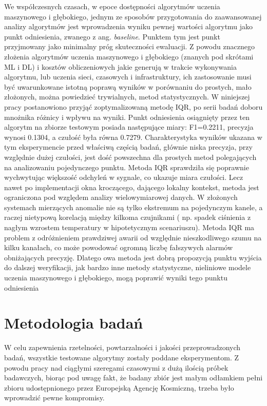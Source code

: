 \documentclass[a4paper,twoside,12pt]{book}
\newcommand{\obcy}[1]{\emph{#1}}
\newcommand{\english}[1]{{\selectlanguage{british}\obcy{#1}}}
\begin{document}
	We współczesnych czasach, w epoce dostępności algorytmów uczenia maszynowego i głębokiego, jednym ze sposobów przygotowania do zaawansowanej analizy algorytmów jest wprowadzenia wyniku pewnej wartości algorytmu jako punkt odniesienia, zwanego z ang. \english{baseline}. Punktem tym jest punkt przyjmowany jako minimalny próg skuteczności ewaluacji. Z powodu znacznego złożenia algorytmów uczenia maszynowego i głębokiego (znanych pod skrótami ML i DL) i kosztów obliczeniowych jakie generują w trakcie wykonywania algorytmu, lub uczenia sieci, czasowych i infrastruktury, ich zastosowanie musi być uwarunkowane istotną poprawą wyników w porównaniu do prostych, mało złożonych, można powiedzieć trywialnych, metod statystycznych. 
	W niniejszej pracy postanowiono przyjąć zoptymalizowaną metodę IQR, po serii badań doboru mnożnika różnicy i wpływu na wyniki. Punkt odniesienia osiągnięty przez ten algorytm na zbiorze testowym posiada następujące miary: F1=0.2211, precyzja wynosi 0.1304, a czułość była równa 0.7279.
	Charakterystyka wyników ukazana w tym eksperymencie przed właściwą częścią badań, głównie niska precyzja, przy względnie dużej czułości, jest dość powszechna dla prostych metod polegających na analizowaniu pojedynczego punktu. Metoda IQR sprawdziła się poprawnie wychwytując większość odchyleń w sygnale, co ukazuje miara czułości. Lecz nawet po implementacji okna kroczącego, dającego lokalny kontekst, metoda jest ograniczona pod względem analizy wielowymiarowej danych. W złożonych systemach mierzących anomalie nie są tylko ekstremum na pojedynczym kanele, a raczej nietypową korelacją między kilkoma czujnikami ( np. spadek ciśnienia z nagłym wzrostem temperatury w hipotetycznym scenariuszu). Metoda IQR ma problem z odróżnieniem prawdziwej awarii od względnie nieszkodliwego szumu na kilku kanałach, co może powodować ogromną liczbę fałszywych alarmów obniżających precyzję. Dlatego owa metoda jest dobrą propozycją punktu wyjścia do dalszej weryfikacji, jak bardzo inne metody statystyczne, nieliniowe modele uczenia maszynowego i głębokiego, mogą poprawić wyniki tego punktu odniesienia 
	
	
	\section{Metodologia badań}
	W celu zapewnienia rzetelności, powtarzalności i jakości przeprowadzonych badań, wszystkie testowane algorytmy zostały poddane eksperymentom. Z powodu pracy nad ciągłymi szeregami czasowymi z dużą ilością próbek badawczych, biorąc pod uwagę fakt, że badany zbiór jest małym odłamkiem pełni zbioru udostępnionego przez Europejską Agencję Kosmiczną, trzeba było wprowadzić pewne kompromisy. 
	
\end{document}
